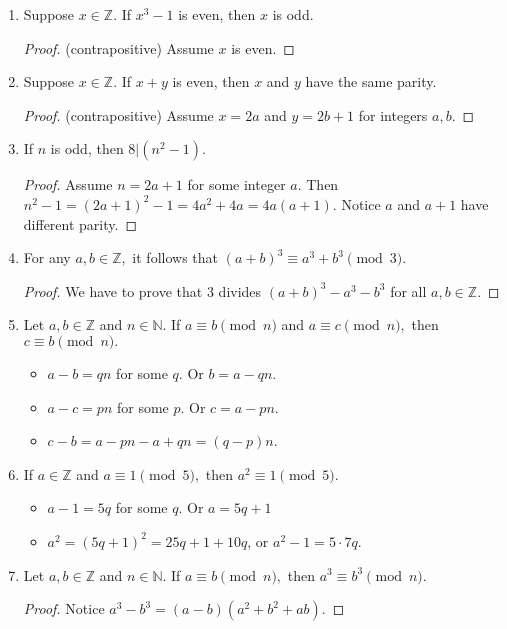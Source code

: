 \documentclass[11pt, oneside]{amsart}
\begin{document}
\begin{enumerate}
\item Suppose \(x \in \mathbb{Z}\).  If \(x^3-1\) is even, then \(x\) is odd.
\label{sec:orgabc1db8}
\begin{proof} (contrapositive) Assume $x$ is even. \end{proof}
\item Suppose \(x \in \mathbb{Z}\).  If \(x+y\) is even, then \(x\) and \(y\) have the same parity.
\label{sec:orgcac42dc}
\begin{proof} (contrapositive) Assume $x=2a$ and $y=2b+1$ for integers $a,b$. \end{proof}
\item If \(n\) is odd, then \(8 \vert (n^2-1)\).
\label{sec:org805af23}
\begin{proof}
Assume $n=2a+1$ for some integer $a$.  Then $n^2-1 = (2a+1)^2 -1 = 4a^2+4a = 4a(a+1)$.  Notice $a$ and $a+1$ have
different parity.
\end{proof}
\item For any \(a, b \in \mathbb{Z},\) it follows that \((a+b)^3 \equiv a^3 + b^3 \pmod{3}.\)
\label{sec:org0d1cf59}
\begin{proof}
We have to prove that 3 divides $(a+b)^3-a^3-b^3$ for all $a,b\in\mathbb{Z}$.
\end{proof}
\item Let \(a, b \in \mathbb{Z}\) and \(n \in \mathbb{N}.\) If \(a \equiv b \pmod{n}\) and \(a \equiv c \pmod{n},\) then \(c \equiv b \pmod{n}.\)
\label{sec:orgb577aab}
\begin{itemize}
\item \(a-b=qn\) for some \(q\). Or \(b=a-qn\).
\item \(a-c=pn\) for some \(p\). Or \(c=a-pn\).
\item \(c-b=a-pn-a+qn=(q-p)n\).
\end{itemize}
\item If \(a \in \mathbb{Z}\) and \(a \equiv 1 \pmod{5},\) then \(a^2 \equiv 1 \pmod{5}.\)
\label{sec:org16634d8}
\begin{itemize}
\item \(a-1=5q\) for some \(q\). Or \(a=5q+1\)
\item \(a^2=(5q+1)^2=25q+1+10q\), or \(a^2-1=5\cdot7q\).
\end{itemize}
\item Let \(a, b \in \mathbb{Z}\) and \(n \in \mathbb{N}.\)  If \(a \equiv b \pmod{n},\)  then \(a^3 \equiv b^3 \pmod{n}.\)
\label{sec:org78861f3}
\begin{proof} Notice $a^3-b^3 = (a-b)(a^2+b^2+ab)$. \end{proof}

\end{enumerate}
\end{document}
